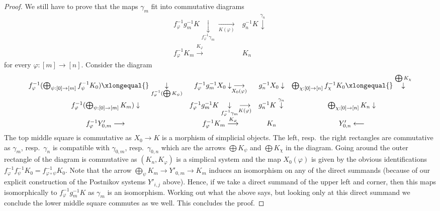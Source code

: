 \begin{proof}
\medskip\noindent
We still have to prove that the maps $\gamma_m$ fit into commutative diagrams
$$
\begin{array}{cc}f_\varphi^{-1}g_m^{-1}K \underset{f_\varphi^{-1}\gamma_m}{\downarrow}\underset{K(\varphi)}{\longrightarrow} & g_n^{-1}K \overset{\gamma_n}{\downarrow} \\ f_\varphi^{-1}K_m \overset{K_\varphi}{\longrightarrow} & K_n\end{array}
$$
for every $\varphi : [m] \to [n]$. Consider the diagram
$$
\begin{array}{cccc}f_\varphi^{-1}(\bigoplus_{\psi : [0] \to [m]} f_\psi^{-1}K_0)
\xlongequal{}\underset{f_\varphi^{-1}(\bigoplus K_\psi)}{\downarrow} & f_\varphi^{-1}g_m^{-1}X_0 \downarrow\underset{X_0(\varphi)}{\longrightarrow} & g_n^{-1}X_0 \downarrow & \bigoplus_{\chi : [0] \to [n]} f_\chi^{-1}K_0
\xlongequal{}\overset{\bigoplus K_\chi}{\downarrow} \\ f_\varphi^{-1}(\bigoplus_{\psi : [0] \to [m]} K_m) \downarrow & f_\varphi^{-1}g_m^{-1}K \underset{f_\varphi^{-1}\gamma_m}{\downarrow}\underset{K(\varphi)}{\longrightarrow} & g_n^{-1}K \overset{\gamma_n}{\downarrow} & \bigoplus_{\chi : [0] \to [n]} K_n \downarrow \\ f_\varphi^{-1}Y'_{0, m} \longrightarrow & f_\varphi^{-1}K_m \overset{K_\varphi}{\longrightarrow} & K_n & Y'_{0, n} \longleftarrow\end{array}
$$
The top middle square is commutative as $X_0 \to K$ is a morphism
of simplicial objects. The left, resp.\ the right rectangles are
commutative as $\gamma_m$, resp.\ $\gamma_n$ is compatible with
$\gamma_{0, m}$, resp.\ $\gamma_{0, n}$ which are the arrows
$\bigoplus K_\psi$ and $\bigoplus K_\chi$ in the diagram.
Going around the outer rectangle of the diagram
is commutative as $(K_n, K_\varphi)$ is a simplical system
and the map $X_0(\varphi)$ is given by the obvious identifications
$f_\varphi^{-1}f_\psi^{-1}K_0 = f_{\varphi \circ \psi}^{-1}K_0$.
Note that the arrow $\bigoplus_\psi K_m \to Y'_{0, m} \to K_m$
induces an isomorphism on any of the direct summands
(because of our explicit construction of the Postnikov
systems $Y'_{i, j}$ above).
Hence, if we take a direct summand of
the upper left and corner, then this maps isomorphically to
$f_\varphi^{-1}g_m^{-1}K$ as $\gamma_m$ is an isomorphism.
Working out what the above says,
but looking only at this direct summand we conclude the lower
middle square commutes as we well. This concludes the proof.
\end{proof}

